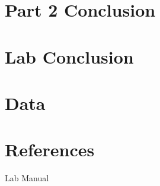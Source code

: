 \documentclass[11pt]{article}
\let\oldsection\section
\renewcommand\section{\clearpage\oldsection}
\begin{document}
    \section{Part 2 Conclusion}\label{sec:part2_conclusion}


    \section{Lab Conclusion}\label{sec:conclusion}


    \appendix
    \section{Data}\label{sec:data}

    \section{References}\label{sec:references}

    Lab Manual
\end{document}
